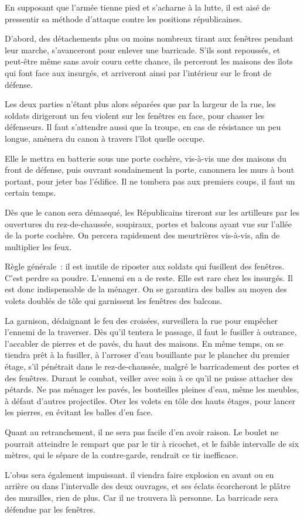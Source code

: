 \documentclass[french,twoside]{book} %
\begin{document}
\noindent En supposant que l’armée tienne pied et s’acharne à la lutte, il est aisé de pressentir sa méthode d’attaque contre les positions républicaines.\par
D'abord, des détachements plus ou moins nombreux tirant aux fenêtres pendant leur marche, s’avanceront pour enlever une barricade. S'ils sont repoussés, et peut-être même sans avoir couru cette chance, ils perceront les maisons des îlots qui font face aux insurgés, et arriveront ainsi par l’intérieur sur le front de défense.\par
Les deux parties n’étant plus alors séparées que par la largeur de la rue, les soldats dirigeront un feu violent sur les fenêtres en face, pour chasser les défenseurs. Il faut s’attendre aussi que la troupe, en cas de résistance un peu longue, amènera du canon à travers l’îlot quelle occupe.\par
Elle le mettra en batterie sous une porte cochère, vis-à-vis une des maisons du front de défense, puis ouvrant soudainement la porte, canonnera les murs à bout portant, pour jeter bas l’édifice. Il ne tombera pas aux premiers coups, il faut un certain temps.\par
Dès que le canon sera démasqué, les Républicains tireront sur les artilleurs par les ouvertures du rez-de-chaussée, soupiraux, portes et balcons ayant vue sur l’allée de la porte cochère. On percera rapidement des meurtrières vis-à-vis, afin de multiplier les feux.\par
Règle générale : il est inutile de riposter aux soldats qui fusillent des fenêtres. C'est perdre sa poudre. L'ennemi en a de reste. Elle est rare chez les insurgés. Il est donc indispensable de la ménager. On se garantira des balles au moyen des volets doublés de tôle qui garnissent les fenêtres des balcons.\par
La garnison, dédaignant le feu des croisées, surveillera la rue pour empêcher l’ennemi de la traverser. Dès qu’il tentera le passage, il faut le fusiller à outrance, l’accabler de pierres et de pavés, du haut des maisons. En même temps, on se tiendra prêt à la fusiller, à l’arroser d’eau bouillante par le plancher du premier étage, s’il pénétrait dans le rez-de-chaussée, malgré le barricadement des portes et des fenêtres. Durant le combat, veiller avec soin à ce qu’il ne puisse attacher des pétards. Ne pas ménager les pavés, les bouteilles pleines d’eau, même les meubles, à défaut d’autres projectiles. Oter les volets en tôle des hauts étages, pour lancer les pierres, en évitant les balles d’en face.\par
Quant au retranchement, il ne sera pas facile d’en avoir raison. Le boulet ne pourrait atteindre le rempart que par le tir à ricochet, et le faible intervalle de six mètres, qui le sépare de la contre-garde, rendrait ce tir inefficace.\par
L'obus sera également impuissant. il viendra faire explosion en avant ou en arrière ou dans l’intervalle des deux ouvrages, et ses éclats écorcheront le plâtre des murailles, rien de plus. Car il ne trouvera là personne. La barricade sera défendue par les fenêtres.\par
\end{document}
